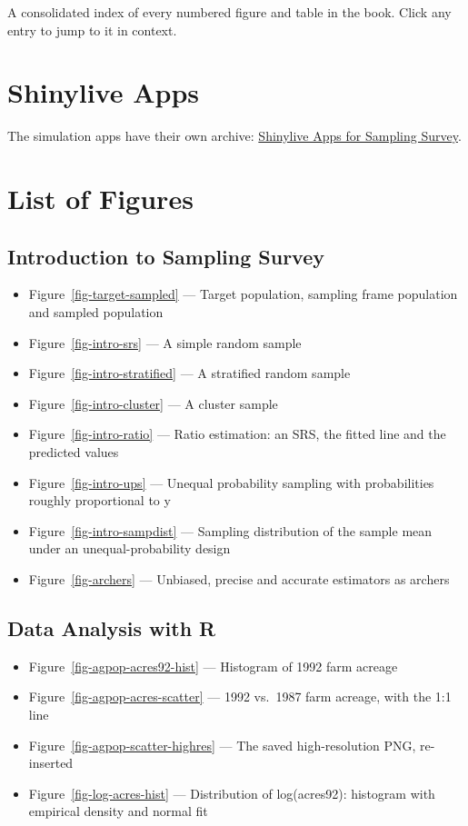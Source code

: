\documentclass[
  letterpaper,
  DIV=11,
  numbers=noendperiod]{scrreprt}
\providecommand{\tightlist}{%
  \setlength{\itemsep}{0pt}\setlength{\parskip}{0pt}}
\renewcommand{\[}{\begin{equation}}
\renewcommand{\]}{\end{equation}}
\begin{document}
A consolidated index of every numbered figure and table in the book.
Click any entry to jump to it in context.

\section{Shinylive Apps}\label{shinylive-apps}

The simulation apps have their own archive:
\href{../shinylives_sampling/index.html}{Shinylive Apps for Sampling
Survey}.

\section{List of Figures}\label{list-of-figures}

\subsection{Introduction to Sampling
Survey}\label{introduction-to-sampling-survey-1}

\begin{itemize}
\tightlist
\item
  Figure~\ref{fig-target-sampled} --- Target population, sampling frame
  population and sampled population
\item
  Figure~\ref{fig-intro-srs} --- A simple random sample
\item
  Figure~\ref{fig-intro-stratified} --- A stratified random sample
\item
  Figure~\ref{fig-intro-cluster} --- A cluster sample
\item
  Figure~\ref{fig-intro-ratio} --- Ratio estimation: an SRS, the fitted
  line and the predicted values
\item
  Figure~\ref{fig-intro-ups} --- Unequal probability sampling with
  probabilities roughly proportional to y
\item
  Figure~\ref{fig-intro-sampdist} --- Sampling distribution of the
  sample mean under an unequal-probability design
\item
  Figure~\ref{fig-archers} --- Unbiased, precise and accurate estimators
  as archers
\end{itemize}

\subsection{Data Analysis with R}\label{data-analysis-with-r-1}

\begin{itemize}
\tightlist
\item
  Figure~\ref{fig-agpop-acres92-hist} --- Histogram of 1992 farm acreage
\item
  Figure~\ref{fig-agpop-acres-scatter} --- 1992 vs.~1987 farm acreage,
  with the 1:1 line
\item
  Figure~\ref{fig-agpop-scatter-highres} --- The saved high-resolution
  PNG, re-inserted
\item
  Figure~\ref{fig-log-acres-hist} --- Distribution of log(acres92):
  histogram with empirical density and normal fit
\end{itemize}
\end{document}

